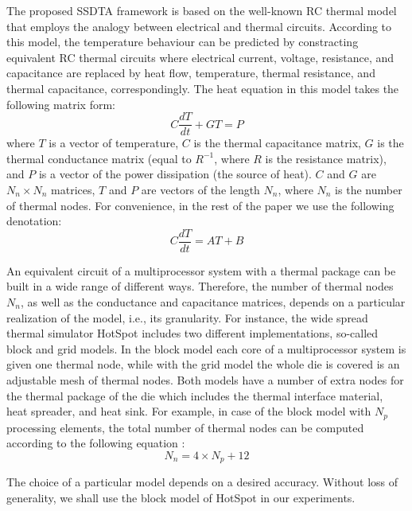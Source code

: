 The proposed SSDTA framework is based on the well-known RC thermal model that employs the analogy between electrical and thermal circuits. According to this model, the temperature behaviour can be predicted by constracting equivalent RC thermal circuits where electrical current, voltage, resistance, and capacitance are replaced by heat flow, temperature, thermal resistance, and thermal capacitance, correspondingly. The heat equation in this model takes the following matrix form:
\begin{equation} \label{eq:thermal-ode}
  C \frac{dT}{dt} + G T = P
\end{equation}
where $T$ is a vector of temperature, $C$ is the thermal capacitance matrix, $G$ is the thermal conductance matrix (equal to $R^{-1}$, where $R$ is the resistance matrix), and $P$ is a vector of the power dissipation (the source of heat). $C$ and $G$ are $N_n \times N_n$ matrices, $T$ and $P$ are vectors of the length $N_n$, where $N_n$ is the number of thermal nodes. For convenience, in the rest of the paper we use the following denotation:
\begin{equation} \label{eq:initial}
  C \frac{dT}{dt} = A T + B
\end{equation}

An equivalent circuit of a multiprocessor system with a thermal package can be built in a wide range of different ways. Therefore, the number of thermal nodes $N_n$, as well as the conductance and capacitance matrices, depends on a particular realization of the model, i.e., its granularity. For instance, the wide spread thermal simulator HotSpot \cite{huang2006} includes two different implementations, so-called block and grid models. In the block model each core of a multiprocessor system is given one thermal node, while with the grid model the whole die is covered is an adjustable mesh of thermal nodes. Both models have a number of extra nodes for the thermal package of the die which includes the thermal interface material, heat spreader, and heat sink. For example, in case of the block model with $N_p$ processing elements, the total number of thermal nodes can be computed according to the following equation \cite{rao2008}:
\begin{equation} \label{eq:nodes}
  N_n = 4 \times N_p + 12
\end{equation}

The choice of a particular model depends on a desired accuracy. Without loss of generality, we shall use the block model of HotSpot in our experiments.
